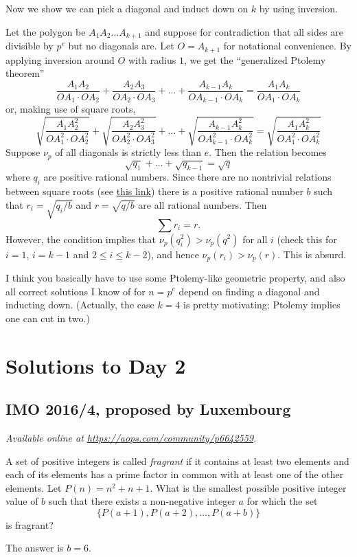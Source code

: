 \documentclass[11pt]{scrartcl}
\begin{document}
Now we show we can pick a diagonal and induct down on $k$ by using inversion.

Let the polygon be $A_1 A_2 \dots A_{k+1}$
and suppose for contradiction that all sides are divisible by $p^e$
but no diagonals are.
Let $O = A_{k+1}$ for notational convenience.
By applying inversion around $O$ with radius $1$,
we get the ``generalized Ptolemy theorem''
\[
  \frac{A_1A_2}{OA_1 \cdot OA_2}
  + \frac{A_2A_3}{OA_2 \cdot OA_3}
  + \dots
  + \frac{A_{k-1} A_k}{OA_{k-1} \cdot OA_k}
  = \frac{A_1 A_k}{OA_1 \cdot OA_k}
\]
or, making use of square roots,
\[
  \sqrt{\frac{A_1A_2^2}{OA_1^2 \cdot OA_2^2}}
  + \sqrt{\frac{A_2A_3^2}{OA_2^2 \cdot OA_3^2}}
  + \dots
  + \sqrt{\frac{A_{k-1} A_k^2}{OA_{k-1}^2 \cdot OA_k^2}}
  = \sqrt{\frac{A_1 A_k^2}{OA_1^2 \cdot OA_k^2}}
\]
Suppose $\nu_p$ of all diagonals is strictly less than $e$.
Then the relation becomes
\[ \sqrt{q_1} + \dots + \sqrt{q_{k-1}} = \sqrt q \]
where $q_i$ are positive rational numbers.
Since there are no nontrivial relations between square roots
(see \href{https://qchu.wordpress.com/2009/07/02/square-roots-have-no-unexpected-linear-relationships/}{this link})
there is a positive rational number $b$
such that $r_i = \sqrt{q_i/b}$ and $r = \sqrt{q/b}$
are all rational numbers.
Then
\[ \sum r_i = r. \]
However, the condition implies that $\nu_p(q_i^2) > \nu_p(q^2)$ for all $i$
(check this for $i=1$, $i=k-1$ and $2 \le i \le k-2$),
and hence $\nu_p(r_i) > \nu_p(r)$.
This is absurd.

\begin{remark*}
  I think you basically have to use some Ptolemy-like geometric property,
  and also all correct solutions I know of for $n = p^e$
  depend on finding a diagonal and inducting down.
  (Actually, the case $k=4$ is pretty motivating;
  Ptolemy implies one can cut in two.)
\end{remark*}
\pagebreak

\section{Solutions to Day 2}
\subsection{IMO 2016/4, proposed by Luxembourg}
\textsl{Available online at \url{https://aops.com/community/p6642559}.}
\begin{mdframed}[style=mdpurplebox,frametitle={Problem statement}]
A set of positive integers is called \emph{fragrant}
if it contains at least two elements and each of its elements
has a prime factor in common with at least one of the other elements.
Let $P(n)=n^2+n+1$.
What is the smallest possible positive integer value of $b$ such that
there exists a non-negative integer $a$ for which the set
\[ \{P(a+1),P(a+2),\dots,P(a+b)\} \]
is fragrant?
\end{mdframed}
The answer is $b = 6$.
\end{document}
